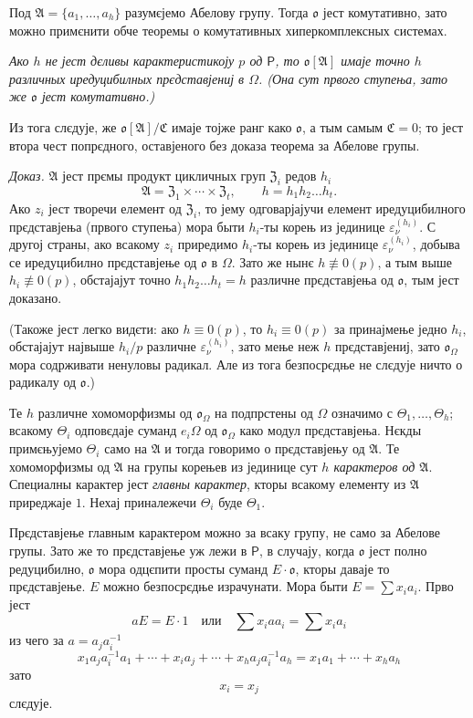 \documentclass[11pt]{article}
\begin{document}
Под \(\mathfrak A=\{a_1,\ldots,a_h\}\) разумєјемо Абелову групу. Тогда \(\mathfrak o\) јест комутативно, зато можно примєнити обче теоремы о комутативных хиперкомплексных системах.

\emph{Ако \(h\) не јест дєливы карактеристикоју \(p\) од \(\mathsf P\), то \(\mathfrak o[\mathfrak A]\) имаје точно \(h\) различных иредуцибилных прєдставјениј в \(\Omega\). (Она сут првого ступења, зато же \(\mathfrak o\) јест комутативно.)}

Из тога слєдује, же \(\mathfrak o[\mathfrak A]/\mathfrak C\) имаје тојже ранг како \(\mathfrak o\), а тым самым \(\mathfrak C=0\); то јест втора чест попрєдного, оставјеного без доказа теорема за Абелове групы.

\emph{Доказ.} \(\mathfrak A\) јест прємы продукт цикличных груп \(\mathfrak Z_i\) редов \(h_i\)
\[
\mathfrak A=\mathfrak Z_1\times\cdots\times\mathfrak Z_t,\qquad
h=h_1h_2\ldots h_t .
\]
Ако \(z_i\) јест творечи елемент од \(\mathfrak Z_i\), то јему одговарјајучи елемент иредуцибилного прєдставјења (првого ступења) мора быти \(h_i\)-ты корењ из јединице \(\varepsilon_\nu^{(h_i)}\). С другој страны, ако всакому \(z_i\) приредимо \(h_i\)-ты корењ из јединице \(\varepsilon_\nu^{(h_i)}\), добыва се иредуцибилно прєдставјење од \(\mathfrak o\) в \(\Omega\). Зато же нынє \(h\not\equiv0(p)\), а тым выше \(h_i\not\equiv0(p)\), обстајајут точно \(h_1h_2\ldots h_t=h\) различне прєдставјења од \(\mathfrak o\), тым јест доказано.

(Такоже јест легко видєти: ако \(h\equiv0(p)\), то \(h_i\equiv0(p)\) за принајмење једно \(h_i\), обстајајут највыше \(h_i/p\) различне \(\varepsilon_\nu^{(h_i)}\), зато мење неж \(h\) прєдставјениј, зато \(\mathfrak o_\Omega\) мора содрживати ненуловы радикал. Але из тога безпосрєдње не слєдује ничто о радикалу од \(\mathfrak o\).)

Те \(h\) различне хомоморфизмы од \(\mathfrak o_\Omega\) на подпрстены од \(\Omega\) означимо с \(\Theta_1,\ldots,\Theta_h\); всакому \(\Theta_i\) одповєдаје суманд \(e_i\Omega\) од \(\mathfrak o_\Omega\) како модул прєдставјења. Нєкды примєњујемо \(\Theta_i\) само на \(\mathfrak A\) и тогда говоримо о прєдставјењу од \(\mathfrak A\). Те хомоморфизмы од \(\mathfrak A\) на групы корењев из јединице сут \emph{\(h\) карактеров од \(\mathfrak A\)}. Специалны карактер јест \emph{главны карактер}, кторы всакому елементу из \(\mathfrak A\) приреджаје \(1\). Нехај приналежечи \(\Theta_i\) буде \(\Theta_1\).

Прєдставјење главным карактером можно за всаку групу, не само за Абелове групы. Зато же то прєдставјење уж лежи в \(\mathsf P\), в случају, когда \(\mathfrak o\) јест полно редуцибилно, \(\mathfrak o\) мора одцєпити просты суманд \(E\cdot\mathfrak o\), кторы даваје то прєдставјење. \(E\) можно безпосрєдње израчунати. Мора быти \(E=\sum x_i a_i\). Прво јест
\[
aE=E\cdot 1\quad\text{или}\quad \sum x_i a a_i=\sum x_i a_i
\]
из чего за \(a=a_j a_i^{-1}\)
\[
x_1a_ja_i^{-1}a_1+\cdots+x_i a_j+\cdots+x_ha_ja_i^{-1}a_h
=x_1a_1+\cdots+x_ha_h
\]
зато
\[
x_i=x_j
\]
слєдује.
\end{document}
